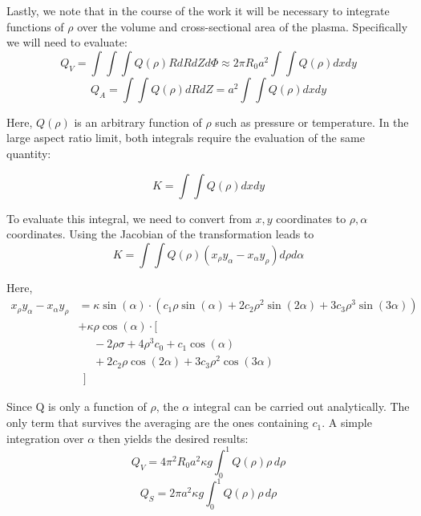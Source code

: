Lastly, we note that in the course of the work it will be necessary to integrate functions of $\rho$ over the volume and cross-sectional area of the plasma. Specifically we will need to evaluate:
\begin{equation}
	Q_V = \int \int \int Q(\rho) R dR dZ d\Phi \approx 2 \pi R_0 a^2 \int \int Q(\rho) dx dy
\end{equation}
\begin{equation}
	Q_A = \int \int Q(\rho) dR dZ = a^2 \int \int Q(\rho) dx dy
\end{equation}

Here, $Q(\rho)$ is an arbitrary function of $\rho$ such as pressure or temperature. In the large aspect ratio limit, both integrals require the evaluation of the same quantity:

\begin{equation}
	K = \int \int Q(\rho) dx dy
\end{equation}

To evaluate this integral, we need to convert from $x, y$ coordinates to $\rho, \alpha$ coordinates. Using the Jacobian of the transformation leads to
\begin{equation}
	K = \int \int Q(\rho) (x_\rho y_\alpha - x_\alpha y_\rho ) d\rho d\alpha
\end{equation}

Here,
\begin{equation}
\begin{split}
	x_\rho y_\alpha - x_\alpha y_\rho & = \kappa \sin(\alpha) \cdot \left( c_1 \rho \sin(\alpha) + 2 c_2 \rho^2 \sin(2\alpha)  + 3 c_3 \rho^3 \sin(3\alpha)  \right) \\
		& + \kappa \rho \cos(\alpha) \cdot \Big[ \\
		& \ \ \ \ \ \ -2 \rho \sigma + 4 \rho^3 c_0 + c_1 \cos(\alpha) \\
		& \ \ \ \ \ \ + 2 c_2 \rho \cos(2\alpha) + 3 c_3 \rho^2 \cos(3\alpha) \\
		& \ \ \Big]
\end{split}	
\end{equation}

Since Q is only a function of $\rho$, the $\alpha$ integral can be carried out analytically. The only term that survives the averaging are the ones containing $c_1$. A simple integration over $\alpha$ then yields the desired results:
 \begin{equation}
  	\label{eq:qv}
 	Q_V = 4 \pi^2 R_0 a^2 \kappa g \int_0^1 Q(\rho) \rho \, d\rho
 \end{equation}
\begin{equation}
	\label{eq:qs}
	Q_S = 2 \pi a^2 \kappa g \int_0^1 Q(\rho) \rho \, d\rho
\end{equation}
